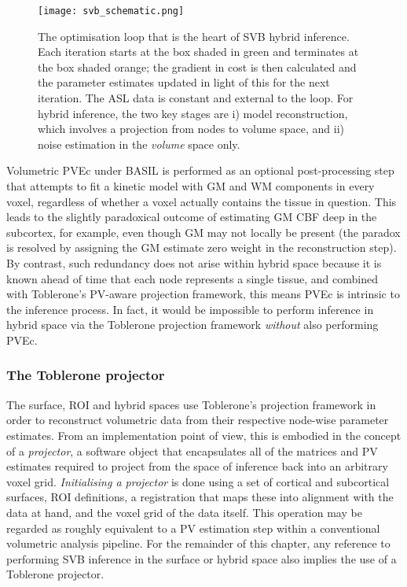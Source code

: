 \begin{figure}
\centering
\texttt{[image: svb\_schematic.png]}
\caption{The optimisation loop that is the heart of SVB hybrid inference. Each iteration starts at the box shaded in green and terminates at the box shaded orange; the gradient in cost is then calculated and the parameter estimates updated in light of this for the next iteration. The ASL data is constant and external to the loop. For hybrid inference, the two key stages are i) model reconstruction, which involves a projection from nodes to volume space, and ii) noise estimation in the \textit{volume} space only.}
\label{svb_schematic} 
\end{figure}

Volumetric PVEc under BASIL is performed as an optional post-processing step that attempts to fit a kinetic model with GM and WM components in every voxel, regardless of whether a voxel actually contains the tissue in question. This leads to the slightly paradoxical outcome of estimating GM CBF deep in the subcortex, for example, even though GM may not locally be present (the paradox is resolved by assigning the GM estimate zero weight in the reconstruction step). By contrast, such redundancy does not arise within hybrid space because it is known ahead of time that each node represents a single tissue, and combined with Toblerone's PV-aware projection framework, this means PVEc is intrinsic to the inference process. In fact, it would be impossible to perform inference in hybrid space via the Toblerone projection framework \textit{without} also performing PVEc.

\subsubsection{The Toblerone projector}
\label{tob_projector_paragraph}

The surface, ROI and hybrid spaces use Toblerone's projection framework in order to reconstruct volumetric data from their respective node-wise parameter estimates. From an implementation point of view, this is embodied in the concept of a \textit{projector}, a software object that encapsulates all of the matrices and PV estimates required to project from the space of inference back into an arbitrary voxel grid. \textit{Initialising a projector} is done using a set of cortical and subcortical surfaces, ROI definitions, a registration that maps these into alignment with the data at hand, and the voxel grid of the data itself. This operation may be regarded as roughly equivalent to a PV estimation step within a conventional volumetric analysis pipeline. For the remainder of this chapter, any reference to performing SVB inference in the surface or hybrid space also implies the use of a Toblerone projector. 


